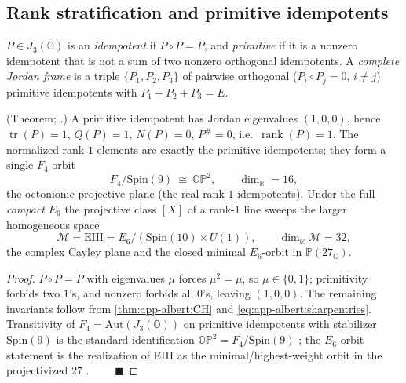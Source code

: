 \subsection{Rank stratification and primitive idempotents}
\label{sec:app-albert:idempotents}

\begin{definition}\label{def:app-albert:idemp}
$P\in J_3(\mathbb O)$ is an \emph{idempotent} if $P\circ P=P$, and
\emph{primitive} if it is a nonzero idempotent that is not a sum of two nonzero
orthogonal idempotents. A \emph{complete Jordan frame} is a triple
$\{P_1,P_2,P_3\}$ of pairwise orthogonal ($P_i\circ P_j=0$, $i\neq j$) primitive
idempotents with $P_1+P_2+P_3=E$.
\end{definition}

\begin{theorem}\label{thm:app-albert:idemp}
\textup{(Theorem; \cite{McCrimmon:2004,Yokota:2009}.)}
A primitive idempotent has Jordan eigenvalues $(1,0,0)$, hence
$\operatorname{tr}(P)=1$, $Q(P)=1$, $N(P)=0$, $P^\#=0$, i.e.\
$\operatorname{rank}(P)=1$. The normalized rank-$1$ elements are exactly the
primitive idempotents; they form a single $F_4$-orbit
\begin{equation}\label{eq:app-albert:OP2}
  F_4/\mathrm{Spin}(9)\ \cong\ \mathbb{OP}^2,
  \qquad \dim_{\mathbb R}=16,
\end{equation}
the octonionic projective plane (the real rank-$1$ idempotents). Under the full
\emph{compact} $E_6$ the projective class $[X]$ of a rank-$1$ line sweeps the
larger homogeneous space
\begin{equation}\label{eq:app-albert:EIII}
  \mathcal M=\mathrm{EIII}=E_6/(\mathrm{Spin}(10)\times U(1)),
  \qquad \dim_{\mathbb R}\mathcal M=32,
\end{equation}
\label{cor:VacuumManifold}
the complex Cayley plane and the closed minimal $E_6$-orbit in
$\mathbb P(27_{\mathbb C})$.
\end{theorem}

\begin{proof}
$P\circ P=P$ with eigenvalues $\mu$ forces $\mu^2=\mu$, so $\mu\in\{0,1\}$;
primitivity forbids two $1$'s, and nonzero forbids all $0$'s, leaving $(1,0,0)$.
The remaining invariants follow from \autoref{thm:app-albert:CH} and
\eqref{eq:app-albert:sharpentries}. Transitivity of $F_4=\mathrm{Aut}(J_3(\mathbb
O))$ on primitive idempotents with stabilizer $\mathrm{Spin}(9)$ is the standard
identification $\mathbb{OP}^2=F_4/\mathrm{Spin}(9)$
\cite{Baez:2002,Yokota:2009}; the $E_6$-orbit statement is the realization of
EIII as the minimal/highest-weight orbit in the projectivized $27$
\cite{Springer:2000}. $\qquad\blacksquare$
\end{proof}

